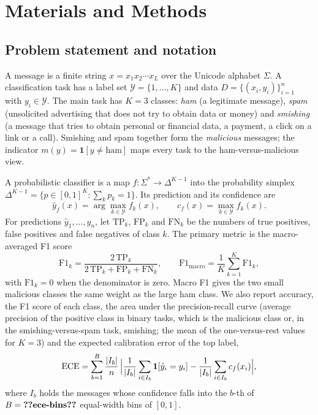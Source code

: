 \section{Materials and Methods}\label{sec:methods}

\subsection{Problem statement and notation}\label{sec:notation}

A message is a finite string $x=x_1x_2\cdots x_L$ over the Unicode alphabet $\Sigma$. A classification task has a label set $\mathcal{Y}=\{1,\dots,K\}$ and data $D=\{(x_i,y_i)\}_{i=1}^{n}$ with $y_i\in\mathcal{Y}$. The main task has $K=3$ classes: \emph{ham} (a legitimate message), \emph{spam} (unsolicited advertising that does not try to obtain data or money) and \emph{smishing} (a message that tries to obtain personal or financial data, a payment, a click on a link or a call). Smishing and spam together form the \emph{malicious} messages; the indicator $m(y)=\mathbf{1}[y\neq\text{ham}]$ maps every task to the ham-versus-malicious view.

A probabilistic classifier is a map $f:\Sigma^{*}\to\Delta^{K-1}$ into the probability simplex $\Delta^{K-1}=\{p\in[0,1]^K:\sum_k p_k=1\}$. Its prediction and its confidence are
\begin{equation}\label{eq:pred}
\hat{y}_f(x)=\arg\max_{k\in\mathcal{Y}} f_k(x),\qquad c_f(x)=\max_{k\in\mathcal{Y}} f_k(x).
\end{equation}
For predictions $\hat{y}_1,\dots,\hat{y}_n$, let $\mathrm{TP}_k$, $\mathrm{FP}_k$ and $\mathrm{FN}_k$ be the numbers of true positives, false positives and false negatives of class $k$. The primary metric is the macro-averaged F1 score
\begin{equation}\label{eq:macrof1}
\mathrm{F1}_k=\frac{2\,\mathrm{TP}_k}{2\,\mathrm{TP}_k+\mathrm{FP}_k+\mathrm{FN}_k},\qquad
\mathrm{F1}_{\mathrm{macro}}=\frac{1}{K}\sum_{k=1}^{K}\mathrm{F1}_k,
\end{equation}
with $\mathrm{F1}_k=0$ when the denominator is zero. Macro F1 gives the two small malicious classes the same weight as the large ham class. We also report accuracy, the F1 score of each class, the area under the precision-recall curve (average precision of the positive class in binary tasks, which is the malicious class or, in the smishing-versus-spam task, smishing; the mean of the one-versus-rest values for $K=3$) and the expected calibration error of the top label,
\begin{equation}\label{eq:ece}
\mathrm{ECE}=\sum_{b=1}^{B}\frac{|I_b|}{n}\,\Bigl|\frac{1}{|I_b|}\sum_{i\in I_b}\mathbf{1}[\hat{y}_i=y_i]-\frac{1}{|I_b|}\sum_{i\in I_b}c_f(x_i)\Bigr|,
\end{equation}
where $I_b$ holds the messages whose confidence falls into the $b$-th of $B=\val{ece-bins}$ equal-width bins of $[0,1]$.

